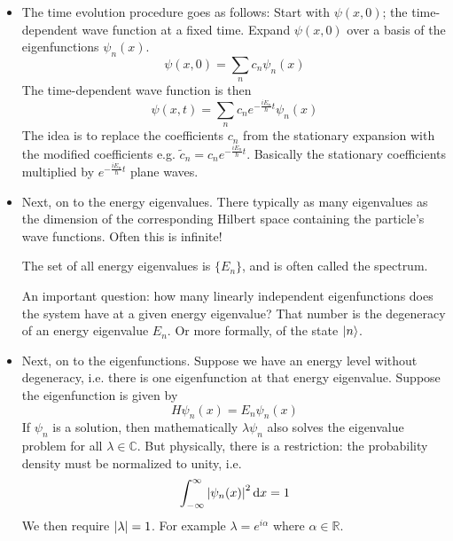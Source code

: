 \documentclass[11pt, a4paper]{article}
\newcommand{\diff}{\mathop{}\!\mathrm{d}} %
\newcommand{\schro}{Schr\"{o}dinger\xspace}
\begin{document}
\begin{itemize}
	We then use the solutions $ \psi_{n}(x) $ of the stationary \schro equation to get the time-dependent wave function $ \psi(x, t) $. This process is called \textit{time evolution}. 
	
	\item The time evolution procedure goes as follows: Start with $ \psi(x, 0) $; the time-dependent wave function at a fixed time. Expand $ \psi(x, 0) $ over a basis of the eigenfunctions $ \psi_{n}(x) $.
	\begin{equation*}
		\psi(x, 0) = \sum_{n} c_{n} \psi_{n}(x)
	\end{equation*}
	The time-dependent wave function is then
	\begin{equation*}
		\psi(x, t) = \sum_{n} c_{n}e^{-\frac{iE_{n}}{\hbar}t}\psi_{n}(x)
	\end{equation*}
	The idea is to replace the coefficients $ c_{n} $ from the stationary expansion with the modified coefficients e.g. $ \tilde{c}_{n} = c_{n}e^{-\frac{iE_{n}}{\hbar}t} $. Basically the stationary coefficients multiplied by $ e^{-\frac{iE_{n}}{\hbar}t} $ plane waves. 
	
	\item Next, on to the energy eigenvalues. There typically as many eigenvalues as the dimension of the corresponding Hilbert space containing the particle's wave functions. Often this is infinite! 
	
	The set of all energy eigenvalues is $ \{E_{n}\} $, and is often called the spectrum. 
	
	An important question: how many linearly independent eigenfunctions does the system have at a given energy eigenvalue? That number is the degeneracy of an energy eigenvalue $ E_{n} $. Or more formally, of the state $ \ket{n} $. 
	
	\item Next, on to the eigenfunctions. Suppose we have an energy level without degeneracy, i.e. there is one eigenfunction at that energy eigenvalue. Suppose the eigenfunction is given by
	\begin{equation*}
		H\psi_{n}(x) = E_{n}\psi_{n}(x)
	\end{equation*}
	If $ \psi_{n} $ is a solution, then mathematically $ \lambda \psi_{n} $ also solves the eigenvalue problem for all $ \lambda \in \mathbb{C} $. But physically, there is a restriction: the probability density must be normalized to unity, i.e. 
	\begin{equation*}
		\int_{-\infty}^{\infty} \abs{\psi_{n}(x)}^{2} \diff x = 1
	\end{equation*}
	We then require $ \abs{\lambda} = 1$. For example $ \lambda = e^{i \alpha} $ where $ \alpha \in \mathbb{R} $. 
	

\end{itemize}
\end{document}
